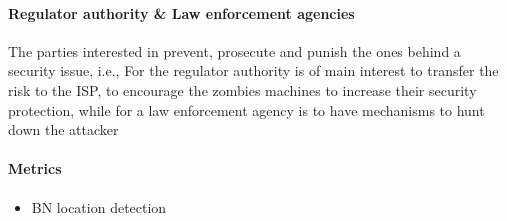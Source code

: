\paragraph{Regulator authority \& Law enforcement agencies}
The parties interested in prevent, prosecute and punish the ones behind a security issue, i.e., For the regulator authority is of main interest to transfer the risk to the ISP, to encourage the zombies machines to increase their security protection, while for a law enforcement agency is to have mechanisms to hunt down the attacker
\paragraph{Metrics}
\begin{itemize}
    \item BN location detection
\end{itemize}




